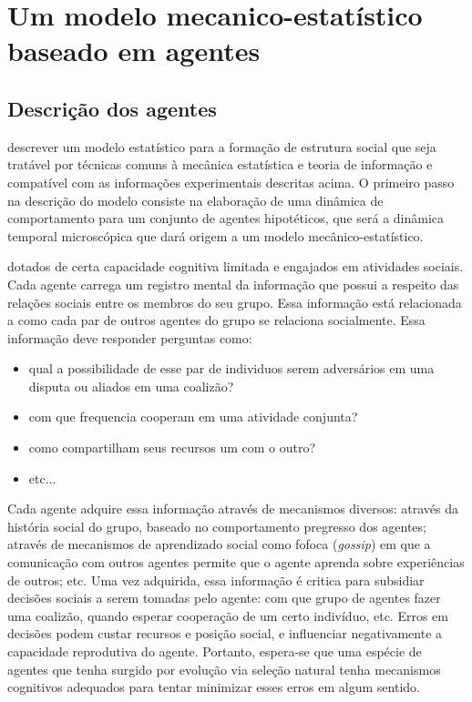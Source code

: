 


\section{Um modelo mecanico-estatístico baseado em agentes}
\subsection{Descrição dos agentes}

 descrever um modelo estatístico para a formação de estrutura social que seja tratável por técnicas comuns à mecânica estatística e teoria de informação e compatível com as informações experimentais descritas acima. O primeiro passo na descrição do modelo consiste na elaboração de uma dinâmica de comportamento para um conjunto de agentes hipotéticos, que será a dinâmica temporal microscópica que dará origem a um modelo mecânico-estatístico. 

 dotados de certa capacidade cognitiva limitada e engajados em atividades sociais. Cada agente carrega um registro mental da informação que possui a respeito das relações sociais entre os membros do seu grupo. Essa informação está relacionada a como cada par de outros agentes do grupo se relaciona socialmente. Essa informação deve responder perguntas como: 
\begin{itemize}
 \item qual a possibilidade de esse par de individuos serem adversários em uma disputa ou aliados em uma coalizão?
 \item com que frequencia cooperam em uma atividade conjunta?
 \item como compartilham seus recursos um com o outro?
 \item etc...
\end{itemize}  
Cada agente adquire essa informação através de mecanismos diversos: através da história social do grupo, baseado no comportamento pregresso dos agentes; através de mecanismos de aprendizado social como fofoca (\textit{gossip}) em que a comunicação com outros agentes permite que o agente aprenda sobre experiências de outros; etc. Uma vez adquirida, essa informação é critica para subsidiar decisões sociais a serem tomadas pelo agente: com que grupo de agentes fazer uma coalizão, quando esperar cooperação de um certo indivíduo, etc. Erros em decisões podem custar recursos e posição social, e influenciar negativamente a capacidade reprodutiva do agente. Portanto, espera-se que uma espécie de agentes que tenha surgido por evolução via seleção natural tenha mecanismos cognitivos adequados para tentar minimizar esses erros em algum sentido. 

